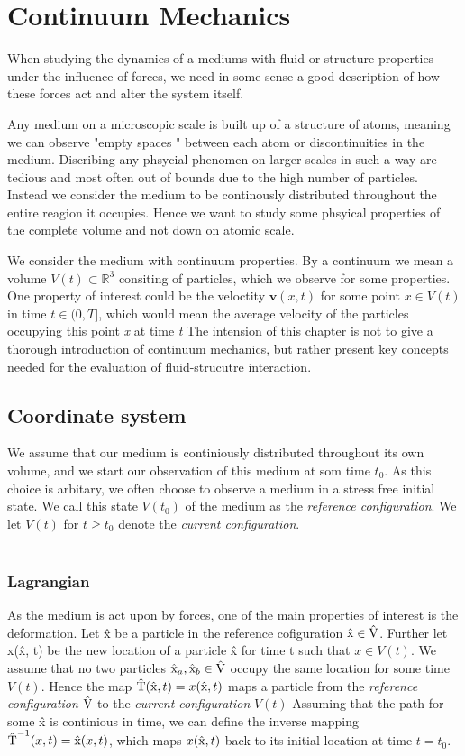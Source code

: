\chapter{Continuum Mechanics}
When studying the dynamics of a mediums with fluid or structure properties under the influence of forces, we need in some sense a good description of how these forces act and alter the system itself.

Any medium on a microscopic scale is built up of a structure of atoms, meaning we can observe "empty spaces " between each atom or discontinuities in the medium. Discribing any phsycial phenomen on larger scales in such a way are tedious and most often out of bounds due to the high number of particles. Instead we consider the medium to be continously distributed throughout the entire reagion it occupies. Hence we want to study some phsyical properties of the complete volume and not down on atomic scale. 

We consider the medium with continuum properties. By a continuum we mean a volume $V(t) \subset \mathbb{R}^3$ 
consiting of particles, which we observe for some properties. One property of interest could be the veloctity $\textbf{v}(x,t)$ for some point $x \in V(t)$ in time $t \in (0, T]$, which would mean the average velocity of the particles occupying this point \textit{x} at time \textit{t}  
The intension of this chapter is not to give a 
thorough introduction of continuum mechanics, but rather present key concepts needed for the evaluation of fluid-strucutre interaction.  

\section{Coordinate system}
We assume that our medium is continiously distributed throughout its own volume, and we start our observation of this medium
at som time $t_0$. As this choice is arbitary, we often choose to observe a medium in a stress free initial state. We call this state $V(t_0)$ of the medium as the \textit{reference configuration}. We let $V(t)$ for 
$t \geq t_0$ denote the \textit{current configuration}. \\ \\

\subsection{Lagrangian}
As the medium is act upon by forces, one of the main properties of interest is the deformation. Let \^{x} be a particle in the reference cofiguration $\text{\^{x}} \in \text{\^{V}}$. 
Further let x(\^x, t) be the new location of a particle \^x for time t such that $x \in V(t)$. We assume that no two particles $\text{\^{x}}_a, \text{\^{x}}_b \in \text{\^{V}}$ occupy the same location for some time $V(t)$.
Hence the map $\text{\^{T}}(\text{\^{x}}, t) = x(\text{\^{x}}, t)$ maps a particle  from the \textit{reference configuration} $\text{\^{V}}$ to the  \textit{current configuration} $V(t)$
Assuming that the path for some \^{x} is continious in time, we can define the inverse mapping $\text{\^{T}}^{-1}(x, t) = \text{\^{x}}(x, t)$, which maps $x(\text{\^{x}}, t)$ back to its initial location at time $t = t_0$. \\

